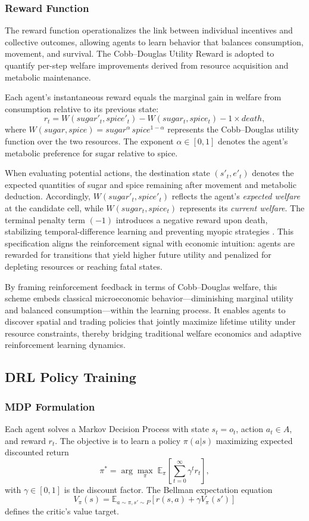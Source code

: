 \documentclass[pdflatex,sn-mathphys-num]{sn-jnl}%
\theoremstyle{thmstyleone}%
\theoremstyle{thmstyletwo}%
\theoremstyle{thmstylethree}%
\begin{document}
\subsubsection{Reward Function}

The reward function operationalizes the link between individual incentives and collective outcomes, allowing agents to learn behavior that balances consumption, movement, and survival.  
The Cobb–Douglas Utility Reward is adopted to quantify per-step welfare improvements derived from resource acquisition and metabolic maintenance.

Each agent’s instantaneous reward equals the marginal gain in welfare from consumption relative to its previous state:
\[
r_t = W(sugar'_t, spice'_t) - W(sugar_t, spice_t) - 1 \times death,
\]
where $W(sugar, spice) = sugar^{\alpha} \, spice^{1-\alpha}$ represents the Cobb–Douglas utility function over the two resources.  
The exponent $\alpha \in [0,1]$ denotes the agent’s metabolic preference for sugar relative to spice.

When evaluating potential actions, the destination state $(s'_t, e'_t)$ denotes the expected quantities of sugar and spice remaining after movement and metabolic deduction.  
Accordingly, $W(sugar'_t, spice'_t)$ reflects the agent’s \emph{expected welfare} at the candidate cell, while $W(sugar_t, spice_t)$ represents its \emph{current welfare}.  
The terminal penalty term $(-1)$ introduces a negative reward upon death, stabilizing temporal-difference learning and preventing myopic strategies \citep{Ng1999, Sert2020}.  
This specification aligns the reinforcement signal with economic intuition: agents are rewarded for transitions that yield higher future utility and penalized for depleting resources or reaching fatal states.

By framing reinforcement feedback in terms of Cobb–Douglas welfare, this scheme embeds classical microeconomic behavior—diminishing marginal utility and balanced consumption—within the learning process.  
It enables agents to discover spatial and trading policies that jointly maximize lifetime utility under resource constraints, thereby bridging traditional welfare economics and adaptive reinforcement learning dynamics.

\subsection{DRL Policy Training}
\subsubsection{MDP Formulation}
Each agent solves a Markov Decision Process with state \(s_t=o_t\), action \(a_t\in A\), and reward \(r_t\).  
The objective is to learn a policy \(\pi(a|s)\) maximizing expected discounted return
\[
\pi^* = \arg\max_{\pi} \; \mathbb{E}_{\pi} \left[ \sum_{t=0}^{\infty} \gamma^t r_t \right],
\]
with $\gamma \in [0,1]$ is the discount factor.  
The Bellman expectation equation
\[
V_\pi(s)=\mathbb{E}_{a\sim\pi,s'\sim P}[r(s,a)+\gamma V_\pi(s')]
\]
defines the critic’s value target.
\end{document}
